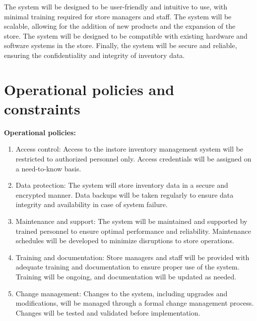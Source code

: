 The system will be designed to be user-friendly and intuitive to use, with minimal training required for store managers and staff. The system will be scalable, allowing for the addition of new products and the expansion of the store. The system will be designed to be compatible with existing hardware and software systems in the store. Finally, the system will be secure and reliable, ensuring the confidentiality and integrity of inventory data.

\section{Operational policies and constraints \label{Section::Operationalpoliciesandconstraints}}

\textbf{Operational policies:}
\begin{enumerate}
\item Access control: Access to the instore inventory management system will be restricted to authorized personnel only. Access credentials will be assigned on a need-to-know basis.
\item Data protection: The system will store inventory data in a secure and encrypted manner. Data backups will be taken regularly to ensure data integrity and availability in case of system failure.
\item Maintenance and support: The system will be maintained and supported by trained personnel to ensure optimal performance and reliability. Maintenance schedules will be developed to minimize disruptions to store operations.
\item Training and documentation: Store managers and staff will be provided with adequate training and documentation to ensure proper use of the system. Training will be ongoing, and documentation will be updated as needed.
\item Change management: Changes to the system, including upgrades and modifications, will be managed through a formal change management process. Changes will be tested and validated before implementation.

\end{enumerate}

